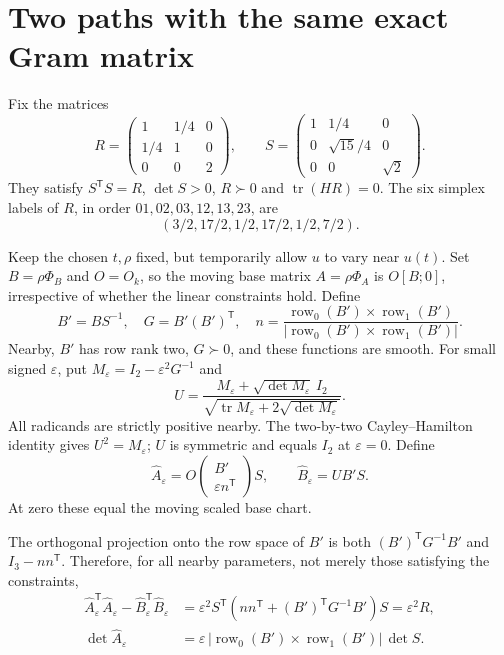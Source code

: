 \documentclass[11pt]{article}
\newcommand{\tr}{\operatorname{tr}}
\newcommand{\transpose}{^{\mathsf T}}
\begin{document}
\section{Two paths with the same exact Gram matrix}
Fix the matrices
\begin{equation}\label{eq:target}
 R=\begin{pmatrix}1&1/4&0\\1/4&1&0\\0&0&2\end{pmatrix},\qquad
 S=\begin{pmatrix}1&1/4&0\\0&\sqrt{15}/4&0\\0&0&\sqrt2\end{pmatrix}.
\end{equation}
They satisfy $S\transpose S=R$, $\det S>0$, $R\succ0$ and
$\tr(HR)=0$. The six simplex labels of $R$, in order $01,02,03,12,13,23$,
are
\begin{equation}\label{eq:targetlabels}
 (3/2,17/2,1/2,17/2,1/2,7/2).
\end{equation}

Keep the chosen $t,\rho$ fixed, but temporarily allow $u$ to vary near
$u(t)$. Set $B=\rho\Phi_B$ and $O=O_k$, so the moving base matrix
$A=\rho\Phi_A$ is $O[B;0]$, irrespective of whether the linear
constraints hold. Define
\[
 B'=BS^{-1},\quad G=B'(B')\transpose,\quad
 n=\frac{\operatorname{row}_0(B')\times\operatorname{row}_1(B')}
 {|\operatorname{row}_0(B')\times\operatorname{row}_1(B')|}.
\]
Nearby, $B'$ has row rank two, $G\succ0$, and these functions are smooth.
For small signed $\varepsilon$, put $M_\varepsilon=I_2-\varepsilon^2G^{-1}$
and
\begin{equation}\label{eq:sqrt}
 U=\frac{M_\varepsilon+\sqrt{\det M_\varepsilon}\,I_2}
 {\sqrt{\tr M_\varepsilon+2\sqrt{\det M_\varepsilon}}}.
\end{equation}
All radicands are strictly positive nearby. The two-by-two
Cayley--Hamilton identity gives $U^2=M_\varepsilon$; $U$ is symmetric
and equals $I_2$ at $\varepsilon=0$. Define
\begin{equation}\label{eq:rawpaths}
 \widehat A_\varepsilon
 =O\begin{pmatrix}B'\\\varepsilon n\transpose\end{pmatrix}S,
 \qquad \widehat B_\varepsilon=UB'S.
\end{equation}
At zero these equal the moving scaled base chart.

The orthogonal projection onto the row space of $B'$ is both
$(B')\transpose G^{-1}B'$ and $I_3-nn\transpose$. Therefore, for all
nearby parameters, not merely those satisfying the constraints,
\begin{align}
 \widehat A_\varepsilon\transpose\widehat A_\varepsilon
 -\widehat B_\varepsilon\transpose\widehat B_\varepsilon
 &=\varepsilon^2S\transpose
       (nn\transpose+(B')\transpose G^{-1}B')S
   =\varepsilon^2R,\label{eq:exactgram}\\
 \det\widehat A_\varepsilon
 &=\varepsilon\,|\operatorname{row}_0(B')\times
                     \operatorname{row}_1(B')|\,\det S.
 \label{eq:exactdet}
\end{align}
\end{document}

